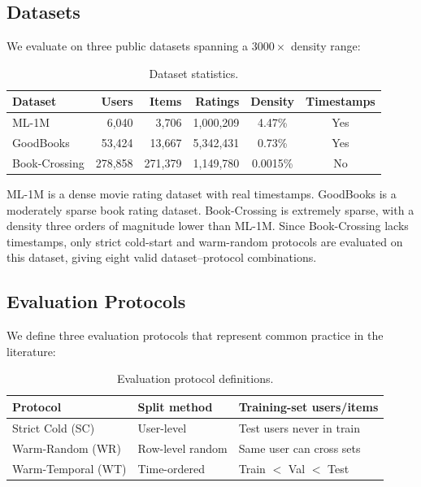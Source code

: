 \documentclass[journal]{IEEEtran}
\begin{document}
\subsection{Datasets}
\label{sec:datasets}

We evaluate on three public datasets spanning a $3000\times$ density range:

\begin{table}[!t]
\centering
\caption{Dataset statistics.}
\label{tab:datasets}
\footnotesize
\begin{tabular}{@{}lrrrcc@{}}
\toprule
Dataset & Users & Items & Ratings & Density & Timestamps \\
\midrule
ML-1M & 6,040 & 3,706 & 1,000,209 & 4.47\% & Yes \\
GoodBooks & 53,424 & 13,667 & 5,342,431 & 0.73\% & Yes \\
Book-Crossing & 278,858 & 271,379 & 1,149,780 & 0.0015\% & No \\
\bottomrule
\end{tabular}
\end{table}

ML-1M is a dense movie rating dataset with real timestamps. GoodBooks is a moderately sparse book rating dataset. Book-Crossing is extremely sparse, with a density three orders of magnitude lower than ML-1M. Since Book-Crossing lacks timestamps, only strict cold-start and warm-random protocols are evaluated on this dataset, giving eight valid dataset--protocol combinations.

\subsection{Evaluation Protocols}
\label{sec:protocols}

We define three evaluation protocols that represent common practice in the literature:

\begin{table}[!t]
\centering
\caption{Evaluation protocol definitions.}
\label{tab:protocols}
\footnotesize
\begin{tabular}{@{}lll@{}}
\toprule
Protocol & Split method & Training-set users/items \\
\midrule
Strict Cold (SC) & User-level & Test users never in train \\
Warm-Random (WR) & Row-level random & Same user can cross sets \\
Warm-Temporal (WT) & Time-ordered & Train $<$ Val $<$ Test \\
\bottomrule
\end{tabular}
\end{table}
\end{document}
